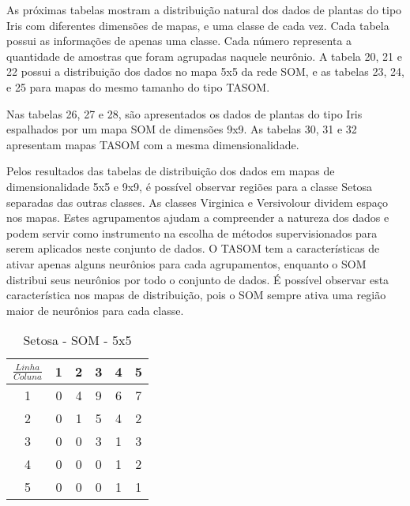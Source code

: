 As próximas tabelas mostram a distribuição natural dos dados de plantas do tipo Iris com diferentes dimensões de mapas, e uma classe de cada vez. Cada tabela possui as informações de apenas uma classe. Cada número representa a quantidade de amostras que foram agrupadas naquele neurônio. A tabela 20, 21 e 22 possui a distribuição dos dados no mapa 5x5 da rede SOM, e as tabelas 23, 24, e 25 para mapas do mesmo tamanho do tipo TASOM.

Nas tabelas 26, 27 e 28, são apresentados os dados de plantas do tipo Iris espalhados por um mapa SOM de dimensões 9x9. As tabelas 30, 31 e 32 apresentam mapas TASOM com a mesma dimensionalidade.

Pelos resultados das tabelas de distribuição dos dados em mapas de dimensionalidade 5x5 e 9x9, é possível observar regiões para a classe Setosa separadas das outras classes. As classes Virginica e Versivolour dividem espaço nos mapas. Estes agrupamentos ajudam a compreender a natureza dos dados e podem servir como instrumento na escolha de métodos supervisionados para serem aplicados neste conjunto de dados. O TASOM tem a características de ativar apenas alguns neurônios para cada agrupamentos, enquanto o SOM distribui seus neurônios por todo o conjunto de dados. É possível observar esta característica nos mapas de distribuição, pois o SOM sempre ativa uma região maior de neurônios para cada classe.


\begin{table}[]
\centering
\caption{Setosa - SOM - 5x5}
\label{my-label}
\begin{tabular}{|c|ccccc|}
\hline
$\frac{Linha}{Coluna}$ & \multicolumn{1}{c|}{1} & \multicolumn{1}{c|}{2}    & \multicolumn{1}{c|}{3}    & \multicolumn{1}{c|}{4}    & 5                         \\ \hline
1                      & 0                      & \cellcolor[HTML]{34CDF9}4 & \cellcolor[HTML]{34CDF9}9 & \cellcolor[HTML]{34CDF9}6 & \cellcolor[HTML]{34CDF9}7 \\ \cline{1-1}
2                      & 0                      & \cellcolor[HTML]{34CDF9}1 & \cellcolor[HTML]{34CDF9}5 & \cellcolor[HTML]{34CDF9}4 & \cellcolor[HTML]{34CDF9}2 \\ \cline{1-1}
3                      & 0                      & 0                         & \cellcolor[HTML]{34CDF9}3 & \cellcolor[HTML]{34CDF9}1 & \cellcolor[HTML]{34CDF9}3 \\ \cline{1-1}
4                      & 0                      & 0                         & 0                         & \cellcolor[HTML]{34CDF9}1 & \cellcolor[HTML]{34CDF9}2 \\ \cline{1-1}
5                      & 0                      & 0                         & 0                         & \cellcolor[HTML]{34CDF9}1 & \cellcolor[HTML]{34CDF9}1 \\ \hline
\end{tabular}
\end{table}


